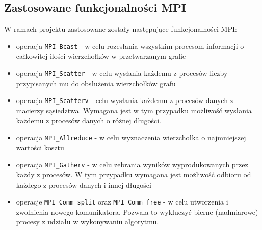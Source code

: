 \documentclass[12pt]{article}
\begin{document}
\subsection{Zastosowane funkcjonalności MPI}
W ramach projektu zastosowane zostały następujące funkcjonalności MPI:
\begin{itemize}
\item operacja \lstinline{MPI_Bcast} - w celu rozesłania wszystkim procesom informacji o całkowitej ilości wierzchołków w przetwarzanym grafie
\item operacja \lstinline{MPI_Scatter} - w celu wysłania każdemu z procesów liczby przypisanych mu do obsłużenia wierzchołków grafu
\item operacja \lstinline{MPI_Scatterv} - celu wysłania każdemu z procesów danych z macierzy sąsiedztwa. Wymagana jest w tym przypadku możliwość wysłania każdemu z procesów danych o różnej długości.
\item operacja \lstinline{MPI_Allreduce} - w celu wyznaczenia wierzchołka o najmniejszej wartości kosztu
\item operacja \lstinline{MPI_Gatherv} - w celu zebrania wyników wyprodukowanych przez każdy z procesów. W tym przypadku wymagana jest możliwość odbioru od każdego z procesów danych i innej długości
\item operacje \lstinline{MPI_Comm_split} oraz \lstinline{MPI_Comm_free} - w celu utworzenia i zwolnienia nowego komunikatora. Pozwala to wykluczyć bierne (nadmiarowe) procesy z udziału w wykonywaniu algorytmu.
\end{itemize}

\newpage
\end{document}
